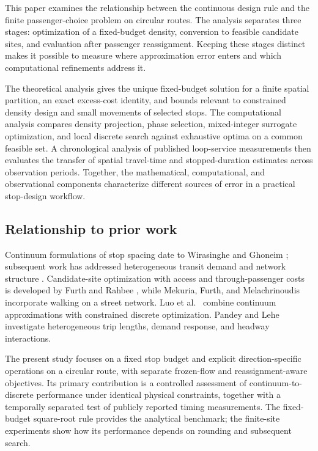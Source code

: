 \documentclass[11pt]{article}
\theoremstyle{remark}\newtheorem{remark}[theorem]{Remark}
\begin{document}
This paper examines the relationship between the continuous design rule and the finite passenger-choice problem on circular routes. The analysis separates three stages: optimization of a fixed-budget density, conversion to feasible candidate sites, and evaluation after passenger reassignment. Keeping these stages distinct makes it possible to measure where approximation error enters and which computational refinements address it.

The theoretical analysis gives the unique fixed-budget solution for a finite spatial partition, an exact excess-cost identity, and bounds relevant to constrained density design and small movements of selected stops. The computational analysis compares density projection, phase selection, mixed-integer surrogate optimization, and local discrete search against exhaustive optima on a common feasible set. A chronological analysis of published loop-service measurements then evaluates the transfer of spatial travel-time and stopped-duration estimates across observation periods. Together, the mathematical, computational, and observational components characterize different sources of error in a practical stop-design workflow.

\subsection{Relationship to prior work}
Continuum formulations of stop spacing date to Wirasinghe and Ghoneim \cite{wirasinghe}; subsequent work has addressed heterogeneous transit demand and network structure \cite{ouyang}. Candidate-site optimization with access and through-passenger costs is developed by Furth and Rahbee \cite{furth}, while Mekuria, Furth, and Melachrinoudis \cite{mekuria} incorporate walking on a street network. Luo et al.\ \cite{luo} combine continuum approximations with constrained discrete optimization. Pandey and Lehe \cite{pandey} investigate heterogeneous trip lengths, demand response, and headway interactions.

The present study focuses on a fixed stop budget and explicit direction-specific operations on a circular route, with separate frozen-flow and reassignment-aware objectives. Its primary contribution is a controlled assessment of continuum-to-discrete performance under identical physical constraints, together with a temporally separated test of publicly reported timing measurements. The fixed-budget square-root rule provides the analytical benchmark; the finite-site experiments show how its performance depends on rounding and subsequent search.
\end{document}
